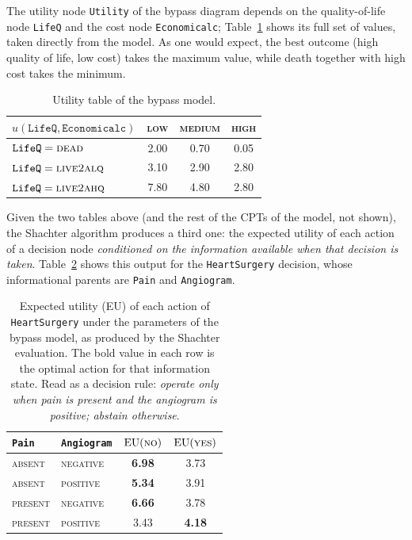 The utility node \texttt{Utility} of the bypass diagram depends on
the quality-of-life node \texttt{LifeQ} and the cost node
\texttt{Economicalc}; Table~\ref{tab:bypass-util} shows its full set
of values, taken directly from the model. As one would expect, the
best outcome (high quality of life, low cost) takes the maximum
value, while death together with high cost takes the minimum.

\begin{table}[h]
\centering\small
\begin{tabular}{l|ccc}
\hline
$u(\texttt{LifeQ}, \texttt{Economicalc})$
                                 & \textsc{low} & \textsc{medium} & \textsc{high}\\
\hline
$\texttt{LifeQ} = \textsc{dead}$     & 2.00 & 0.70 & 0.05\\
$\texttt{LifeQ} = \textsc{live2alq}$ & 3.10 & 2.90 & 2.80\\
$\texttt{LifeQ} = \textsc{live2ahq}$ & 7.80 & 4.80 & 2.80\\
\hline
\end{tabular}
\caption{Utility table of the bypass model.}
\label{tab:bypass-util}
\end{table}

Given the two tables above (and the rest of the CPTs of the model,
not shown), the Shachter algorithm produces a third one: the
expected utility of each action of a decision node \emph{conditioned
on the information available when that decision is taken}.
Table~\ref{tab:bypass-eu} shows this output for the
\texttt{HeartSurgery} decision, whose informational parents are
\texttt{Pain} and \texttt{Angiogram}.

\begin{table}[h]
\centering\small
\begin{tabular}{ll|cc}
\hline
\texttt{Pain} & \texttt{Angiogram}
              & $\mathrm{EU}(\textsc{no})$
              & $\mathrm{EU}(\textsc{yes})$\\
\hline
\textsc{absent}  & \textsc{negative} & \textbf{6.98} & 3.73 \\
\textsc{absent}  & \textsc{positive} & \textbf{5.34} & 3.91 \\
\textsc{present} & \textsc{negative} & \textbf{6.66} & 3.78 \\
\textsc{present} & \textsc{positive} & 3.43          & \textbf{4.18}\\
\hline
\end{tabular}
\caption{Expected utility (EU) of each action of \texttt{HeartSurgery}
under the parameters of the bypass model, as produced by the
Shachter evaluation. The bold value in each row is the optimal
action for that information state. Read as a decision rule:
\emph{operate only when pain is present and the angiogram is
positive; abstain otherwise}.}
\label{tab:bypass-eu}
\end{table}

